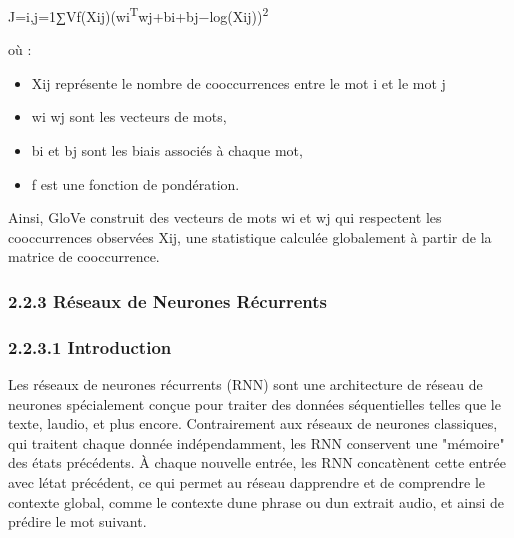 \documentclass[
]{article}
\begin{document}
J=i,j=1∑V\hspace{0pt}f(Xij\hspace{0pt})(wi\textsuperscript{T}\hspace{0pt}wj\hspace{0pt}+bi\hspace{0pt}+bj\hspace{0pt}−log(Xij\hspace{0pt}))\textsuperscript{2}

où :

\begin{itemize}
\item
  Xij représente le nombre de cooccurrences entre le mot i et le mot j
\item
  wi wj sont les vecteurs de mots,
\item
  bi et bj\hspace{0pt} sont les biais associés à chaque mot,
\item
  f est une fonction de pondération.
\end{itemize}

Ainsi, GloVe construit des vecteurs de mots wi et wj\hspace{0pt} qui
respectent les cooccurrences observées Xij, une statistique calculée
globalement à partir de la matrice de cooccurrence.

\subsubsection{2.2.3 Réseaux de Neurones
Récurrents}\label{ruxe9seaux-de-neurones-ruxe9currents}

\subsubsection{2.2.3.1 Introduction}\label{introduction-2}

Les réseaux de neurones récurrents (RNN) sont une architecture de réseau
de neurones spécialement conçue pour traiter des données séquentielles
telles que le texte, l\textquotesingle audio, et plus encore.
Contrairement aux réseaux de neurones classiques, qui traitent chaque
donnée indépendamment, les RNN conservent une "mémoire" des états
précédents. À chaque nouvelle entrée, les RNN concatènent cette entrée
avec l\textquotesingle état précédent, ce qui permet au réseau
d\textquotesingle apprendre et de comprendre le contexte global, comme
le contexte d\textquotesingle une phrase ou d\textquotesingle un extrait
audio, et ainsi de prédire le mot suivant.
\end{document}
